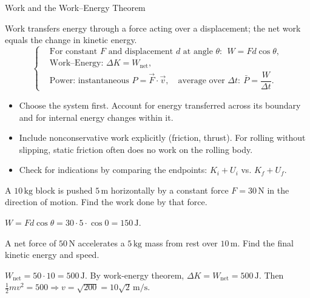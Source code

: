 \label{unit:energy}

\begin{KnowledgePoint}{Work and the Work--Energy Theorem \Core}
  \KPFormulas
\begin{formulabox}
  Work transfers energy through a force acting over a displacement; the net work equals the change in kinetic energy.
  \[
  \left\{\begin{aligned}
    &\text{For constant }F\text{ and displacement }d\text{ at angle }\theta:\ \ W=Fd\cos\theta,\\
    &\text{Work--Energy: }\Delta K=W_{\text{net}},\\
    &\text{Power: instantaneous }P=\vec F\cdot\vec v,\quad \text{average over }\Delta t:\ \bar P=\dfrac{W}{\Delta t}.
  \end{aligned}\right.
  \]
\end{formulabox}

  \KPHeuristics
\begin{heuristicsbox}
\begin{itemize}[leftmargin=*]
  \item Choose the system first. Account for energy transferred across its boundary and for internal energy changes within it.
  \item Include nonconservative work explicitly (friction, thrust). For rolling without slipping, static friction often does no work on the rolling body.
  \item Check for indications by comparing the endpoints: $K_i+U_i$ vs. $K_f+U_f$.
\end{itemize}
\end{heuristicsbox}

  \KPProblems
\begin{cheatproblem}
  A $10\,\text{kg}$ block is pushed $5\,\text{m}$ horizontally by a constant force $F=30\,\text{N}$ in the direction of motion. Find the work done by that force.
\begin{solutionbox}
  $W=Fd\cos\theta=30\cdot5\cdot\cos0=150\,\text{J}$.
\end{solutionbox}
\end{cheatproblem}
\begin{cheatproblem}
  A net force of $50\,\text{N}$ accelerates a $5\,\text{kg}$ mass from rest over $10\,\text{m}$. Find the final kinetic energy and speed.
\begin{solutionbox}
  $W_{\text{net}}=50\cdot10=500\,\text{J}$. By work-energy theorem, $\Delta K=W_{\text{net}}=500\,\text{J}$. Then $\tfrac12mv^2=500\Rightarrow v=\sqrt{200}=10\sqrt2\,\text{m/s}$.
\end{solutionbox}
\end{cheatproblem}
\end{KnowledgePoint}


